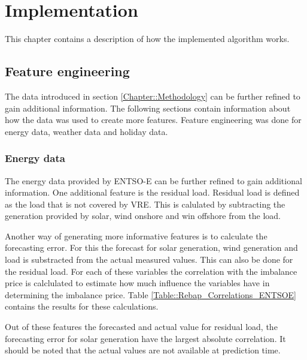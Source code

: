 \documentclass[class=scrbook, crop=false]{standalone}
\begin{document}
\chapter{Implementation} %
\label{Chapter::Implementation}
    This chapter contains a description of how the implemented algorithm works.

\section{Feature engineering}
\label{Section::Feature_engineering}

The data introduced in section \ref{Chapter::Methodology} can be further refined to gain additional information. 
The following sections contain information about how the data was used to create more features.
Feature engineering was done for energy data, weather data and holiday data.

    \subsection{Energy data}
    \label{Section::Energy_Data}
    The energy data provided by ENTSO-E can be further refined to gain additional information.
    One additional feature is the residual load. 
    Residual load is defined as the load that is not covered by VRE. 
    This is calulated by subtracting the generation provided by solar, wind onshore and win offshore from the load.
    
    Another way of generating more informative features is to calculate the forecasting error. 
    For this the forecast for solar generation, wind generation and load is substracted from the actual measured values.
    This can also be done for the residual load.
    For each of these variables the correlation with the imbalance price is calclulated to estimate how much influence the variables have in determining the imbalance price.
    Table \ref{Table::Rebap_Correlations_ENTSOE} contains the results for these calculations. 
    
    Out of these features the forecasted and actual value for residual load, the forecasting error for solar generation have the largest absolute correlation.
    It should be noted that the actual values are not available at prediction time.    
\end{document}
